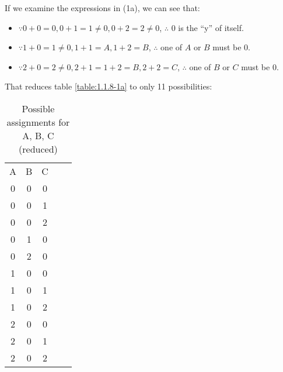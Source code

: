 \documentclass[12pt, letterpaper, oneside]{book}
\begin{document}
If we examine the expressions in (1a), we can see that:
\begin{itemize}
  \item $\because 0 + 0 = 0, 0 + 1 = 1 \ne 0, 0 + 2 = 2 \ne 0$, $\therefore$ $0$ is the ``y'' of itself.
  \item $\because 1 + 0 = 1 \ne 0, 1 + 1 = A, 1 + 2 = B$, $\therefore$ one of $A$ or $B$ must be $0$.
  \item $\because 2 + 0 = 2 \ne 0, 2 + 1 = 1 + 2 = B, 2 + 2 = C$, $\therefore$ one of $B$ or $C$ must be $0$.
\end{itemize}

That reduces table \ref{table:1.1.8-1a} to only 11 possibilities:

\begin{table}[H]
  \centering
  \begin{tabular}{|c|c|c|ll}
    \cline{1-3}
    A & B & C &  & \\ [1ex] \cline{1-3}
    0 & 0 & 0 &  & \\ [0.5ex] \cline{1-3}
    0 & 0 & 1 &  & \\ [0.5ex] \cline{1-3}
    0 & 0 & 2 &  & \\ [0.5ex] \cline{1-3}
    0 & 1 & 0 &  & \\ [0.5ex] \cline{1-3}
    0 & 2 & 0 &  & \\ [0.5ex] \cline{1-3}
    1 & 0 & 0 &  & \\ [0.5ex] \cline{1-3}
    1 & 0 & 1 &  & \\ [0.5ex] \cline{1-3}
    1 & 0 & 2 &  & \\ [0.5ex] \cline{1-3}
    2 & 0 & 0 &  & \\ [0.5ex] \cline{1-3}
    2 & 0 & 1 &  & \\ [0.5ex] \cline{1-3}
    2 & 0 & 2 &  & \\ [0.5ex] \cline{1-3}
  \end{tabular}
  \caption{Possible assignments for A, B, C (reduced)}
  \label{table:1.1.8-1b}
\end{table}
\end{document}
